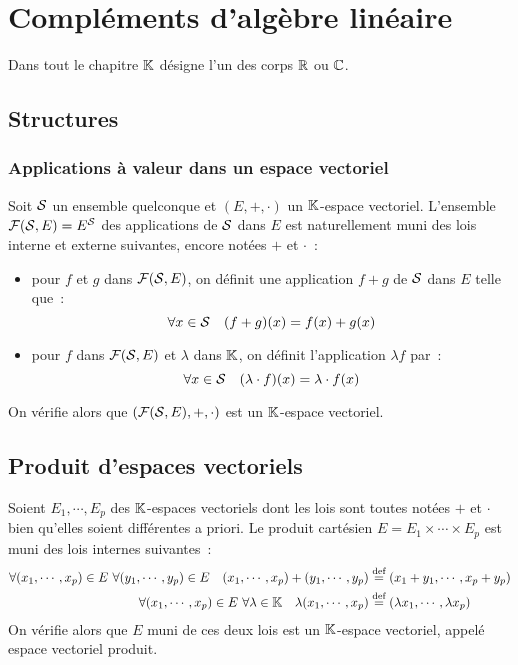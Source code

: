 \addtocounter{chapter}{-3}
\chapter{Compléments d'algèbre linéaire}
\minitoc
\minilof
\minilot

Dans tout le chapitre $\K$ désigne l'un des corps $\R$ ou $\C$.
\section{Structures}
\subsection{Applications à valeur dans un espace vectoriel}
Soit $\S$ un ensemble quelconque et $(E,+,\cdot)$ un $\K$-espace vectoriel. L'ensemble $\F(\S,E) = E^{\S}$ des applications de $\S$ dans $E$ est naturellement muni des lois interne et externe suivantes, encore notées $+$ et $\cdot$~:
\begin{itemize}
	\item pour $f$ et $g$ dans $\F(\S,E)$, on définit une application $f+g$ de $\S$ dans $E$ telle que~:
	\begin{equation}
		\forall x \in \S \quad (f+g)(x) = f(x)+g(x)
	\end{equation}
	\item pour $f$ dans $\F(\S,E)$ et $\lambda$ dans $\K$, on définit l'application $\lambda f$ par~:
	\begin{equation}
		\forall x \in \S \quad (\lambda \cdot f)(x) = \lambda \cdot f(x)
	\end{equation}
\end{itemize}
On vérifie alors que $(\F(\S,E), +, \cdot)$ est un $\K$-espace vectoriel.
\section{Produit d'espaces vectoriels}
Soient $E_1, \cdots, E_p$ des $\K$-espaces vectoriels dont les lois sont toutes notées $+$ et $\cdot$ bien qu'elles soient différentes a priori. Le produit cartésien $E = E_1 \times \cdots \times E_p$ est muni des lois internes suivantes~:
\begin{align}
	\forall (x_1, \cdots, x_p) \in E \ \forall (y_1, \cdots, y_p) \in E \quad (x_1, \cdots, x_p) + (y_1, \cdots, y_p) &\overset{\text{def}}{=} (x_1+y_1, \cdots, x_p+y_p) \\
	\forall (x_1, \cdots, x_p) \in E \ \forall \lambda \in \K \quad \lambda (x_1, \cdots, x_p) &\overset{\text{def}}{=} (\lambda x_1, \cdots, \lambda x_p)
\end{align}
On vérifie alors que $E$ muni de ces deux lois est un $\K$-espace vectoriel, appelé espace vectoriel produit.
